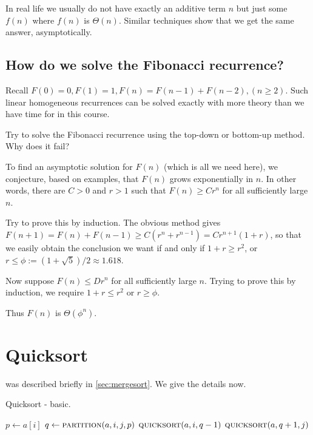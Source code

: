 In real life we usually do not have exactly an additive term $n$
but just some $f(n)$ where $f(n)$ is $\Theta(n)$. Similar techniques show that 
we get the same answer, asymptotically. 


\section{How do we solve the Fibonacci recurrence?}
Recall $F(0) = 0, F(1) = 1, F(n) = F(n-1) + F(n-2), (n \geq 2)$.
Such linear homogeneous recurrences can be solved exactly with
more theory than we have time for in this course. 

\begin{Boxample}[2]
Try to solve the Fibonacci recurrence using the top-down or bottom-up method. Why does it fail?

\end{Boxample}

To find an asymptotic solution for $F(n)$ (which is all we need here), we conjecture, based on examples, 
that $F(n)$ grows exponentially in $n$. 
In other words, there are $C > 0$ and $r > 1$ such that 
$F(n) \geq C r^n$ for all sufficiently large $n$.

Try to prove this by induction. The obvious method gives 
$F(n+1) = F(n) + F(n-1) \geq C(r^n + r^{n-1}) = Cr^{n+1}(1+r)$, so that we easily obtain
the conclusion we want if and only if $1 + r \geq r^2$, or $r \leq
\phi:= (1 + \sqrt{5})/2 \approx 1.618$. 

Now suppose $F(n) \leq D r^n$ for all sufficiently large $n$. 
Trying to prove this by induction, we require $1 + r \leq r^2$ or $r \geq \phi$. 

Thus $F(n)$ is $\Theta(\phi^n)$.


\chapter{Quicksort} %
\label{sec:quicksort}

 was described briefly in \cref{sec:mergesort}. We give the details now.

\begin{algorithm}[H]
  \caption{Quicksort - basic.}    
  \label{alg:quicksort}
\begin{algorithmic}[0]
			\State $p \gets a[i]$ 
			\State $q \gets  \Call{partition}{a, i,j,p}$ 
			\State $\Call{quicksort}{a,i,q-1}$ 
			\State $\Call{quicksort}{a,q+1,j}$ 
		\EndIf
	\EndFunction  
\end{algorithmic}
\end{algorithm}


